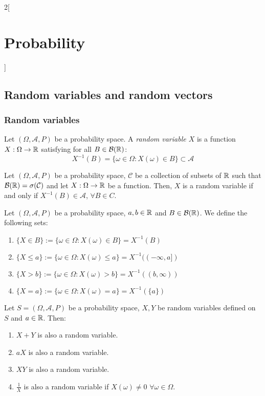 \documentclass[../../../main.tex]{subfiles}
\begin{document}
\begin{multicols}{2}[\section{Probability}]
  \subsection{Random variables and random vectors}
  \subsubsection*{Random variables}
  \begin{definition}
    Let $(\Omega,\mathcal{A},P)$ be a probability space. A \textit{random variable $X$} is a function $X:\Omega\rightarrow\mathbb{R}$ satisfying for all $B\in\mathcal{B}(\mathbb{R})$: $$X^{-1}(B)=\{\omega\in\Omega:X(\omega)\in B\}\subset\mathcal{A}$$
  \end{definition}
  \begin{prop}
    Let $(\Omega,\mathcal{A},P)$ be a probability space, $\mathcal{C}$ be a collection of subsets of $\mathbb{R}$ such that $\mathcal{B}(\mathbb{R})=\sigma(\mathcal{C})$ and let $X:\Omega\rightarrow\mathbb{R}$ be a function. Then, $X$ is a random variable if and only if $X^{-1}(B)\in\mathcal{A}$, $\forall B\in C$.
  \end{prop}
  \begin{definition}
    Let $(\Omega,\mathcal{A},P)$ be a probability space, $a,b\in\mathbb{R}$ and $B\in\mathcal{B}(\mathbb{R})$. We define the following sets:
    \begin{enumerate}
      \item $\displaystyle\{X\in B\}:=\{\omega\in\Omega:X(\omega)\in B\}=X^{-1}(B)$
      \item $\displaystyle\{X\leq a\}:=\{\omega\in\Omega:X(\omega)\leq a\}=X^{-1}((-\infty,a])$
      \item $\displaystyle\{X> b\}:=\{\omega\in\Omega:X(\omega)>b\}=X^{-1}((b,\infty))$
      \item $\displaystyle\{X=a\}:=\{\omega\in\Omega:X(\omega)=a\}=X^{-1}(\{a\})$
    \end{enumerate}
  \end{definition}
  \begin{prop}
    Let $S=(\Omega,\mathcal{A},P)$ be a probability space, $X,Y$ be random variables defined on $S$ and $a\in\mathbb{R}$. Then:
    \begin{enumerate}
      \item $X+Y$ is also a random variable.
      \item $aX$ is also a random variable.
      \item $XY$ is also a random variable.
      \item $\frac{1}{X}$ is also a random variable if $X(\omega)\ne 0$ $\forall \omega\in\Omega$.

\end{enumerate}
\end{prop}
\end{multicols}
\end{document}
